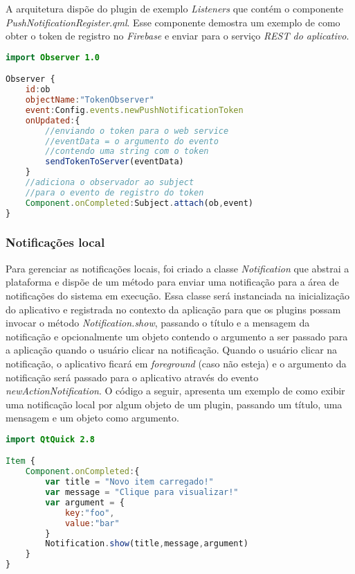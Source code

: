 A arquitetura dispõe do plugin de exemplo \textit{Listeners} que contém o componente \textit{PushNotificationRegister.qml}. Esse componente demostra um exemplo de como obter o token de registro no \textit{Firebase} e enviar para o serviço \textit{REST do aplicativo}.


\begin{center}
\begin{lstlisting}[language=qml]
import Observer 1.0

Observer {
	id:ob
    objectName:"TokenObserver"
    event:Config.events.newPushNotificationToken
    onUpdated:{
		//enviando o token para o web service
		//eventData = o argumento do evento
		//contendo uma string com o token
		sendTokenToServer(eventData)
	}
	//adiciona o observador ao subject
	//para o evento de registro do token
	Component.onCompleted:Subject.attach(ob,event)
}
\end{lstlisting}
\end{center}

\subsubsection{Notificações local}
Para gerenciar as notificações locais, foi criado a classe \textit{Notification} que abstrai a plataforma e dispõe de um método para enviar uma notificação para a área de notificações do sistema em execução. Essa classe será instanciada na inicialização do aplicativo e registrada no contexto da aplicação para que os plugins possam invocar o método \textit{Notification.show}, passando o título e a mensagem da notificação e opcionalmente um objeto contendo o argumento a ser passado para a aplicação quando o usuário clicar na notificação. Quando o usuário clicar na notificação, o aplicativo ficará em \textit{foreground} (caso não esteja) e o argumento da notificação será passado para o aplicativo através do evento \textit{newActionNotification}. O código a seguir, apresenta um exemplo de como exibir uma notificação local por algum objeto de um plugin, passando um título, uma mensagem e um objeto como argumento.

\begin{center}
\begin{lstlisting}[language=qml]
import QtQuick 2.8

Item {
    Component.onCompleted:{
		var title = "Novo item carregado!"
		var message = "Clique para visualizar!"
		var argument = {
			key:"foo",
			value:"bar"
		}
		Notification.show(title,message,argument)
	}
}
\end{lstlisting}
\end{center}


